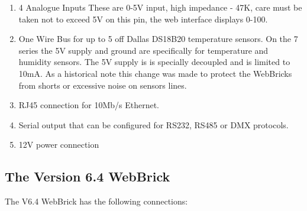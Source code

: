 \begin{enumerate}
\item
4 Analogue Inputs These are 0-5V input, high impedance - 47K, care must be taken not to exceed 5V on this pin, 
the web interface displays 0-100.

\item
One Wire Bus for up to 5 off Dallas DS18B20 temperature sensors.  On the 7 series the 5V supply and ground are specifically for temperature and humidity sensors.  The 5V supply is is specially decoupled and is limited to 10mA.  As a historical note this change was made to protect the WebBricks from shorts or excessive noise on sensors lines.

\item
RJ45 connection for 10Mb/s Ethernet.

\item
Serial output that can be configured for RS232, RS485 or DMX protocols.

\item
12V power connection

\end{enumerate}



\subsection {The Version 6.4 WebBrick}

The V6.4 WebBrick has the following connections:


